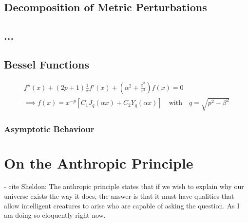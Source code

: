 \documentclass[parskip=half]{scrreprt}
\begin{document}
\begin{appendices}
\section{Decomposition of Metric Perturbations}\label{app:deriv_decompose}

\section{...}

\section{Bessel Functions}

\begin{align}
	f''(x) + \left(2p+1\right)\frac{1}{x} f'(x) + \left(\alpha^2 + \frac{\beta^2}{x^2}\right) f(x) = 0 \\
	\implies f(x) = x^{-p} \left[C_1 J_q(\alpha x) + C_2 Y_q(\alpha x)\right] \quad \text{with} \quad q = \sqrt{p^2 - \beta^2}
\end{align}

\subsection*{Asymptotic Behaviour}


\chapter{On the Anthropic Principle}\label{app:anthropic}

- cite Sheldon: The anthropic principle states that if we wish to explain why our universe exists the way it does, the answer is that it must have qualities that allow intelligent creatures to arise who are capable of asking the question. As I am doing so eloquently right now.

\end{appendices}



\end{document}
